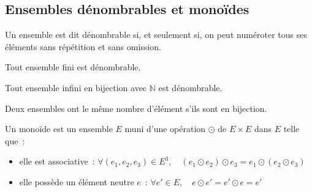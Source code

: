 \documentclass[a4paper, titlepage]{article}
\begin{document}
    \subsection{Ensembles dénombrables et monoïdes}
    \begin{defn}
        Un ensemble est dit dénombrable si, et seulement si, on peut numéroter tous ses éléments sans répétition et
        sans omission.
    \end{defn}
    \begin{props}
        Tout ensemble fini est dénombrable.

        Tout ensemble infini en bijection avec $\mathbb{N}$ est dénombrable.
    \end{props}
    Deux ensembles ont le même nombre d'élément s'ils sont en bijection.
    \begin{defn}
        Un monoïde est un ensemble $E$ muni d'une opération $\odot$ de $E\times E$ dans $E$ telle que~:
        \begin{itemize}
            \item elle est associative~: 
                $\forall (e_1,e_2,e_3)\in E^3,\quad (e_1\odot e_2)\odot e_3 = e_1\odot (e_2\odot e_3)$
            \item elle possède un élément neutre $e$~: $\forall e'\in E,\quad e\odot e'=e'\odot e = e'$
        \end{itemize}
    \end{defn}
\end{document}
